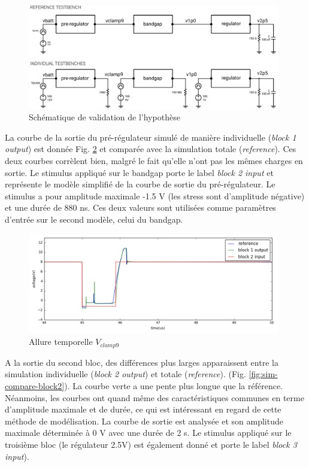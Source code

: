 \begin{figure}[!h]
  \centering
  \includegraphics[width=0.98\textwidth]{src/1/figures/hypothesis_testing_setup.pdf}
  \caption{Schématique de validation de l'hypothèse}
  \label{fig:hypothesis-setup}
\end{figure}

La courbe de la sortie du pré-régulateur simulé de manière individuelle (\textit{block 1 output}) est donnée Fig. \ref{fig:sim-compare-block1} et comparée avec la simulation totale (\textit{reference}).
Ces deux courbes corrèlent bien, malgré le fait qu'elle n'ont pas les mêmes charges en sortie.
Le stimulus appliqué sur le bandgap porte le label \textit{block 2 input} et représente le modèle simplifié de la courbe de sortie du pré-régulateur.
Le stimulus a pour amplitude maximale -1.5 V (les stress sont d'amplitude négative) et une durée de 880 ns.
Ces deux valeurs sont utilisées comme paramètres d'entrée sur le second modèle, celui du bandgap.

\begin{figure}[!h]
  \centering
  \includegraphics[width=0.98\textwidth]{src/1/figures/simulation_comparison_block1.png}
  \caption{Allure temporelle $V_{clamp9}$}
  \label{fig:sim-compare-block1}
\end{figure}

A la sortie du second bloc, des différences plus larges apparaissent entre la simulation individuelle (\textit{block 2 output}) et totale (\textit{reference}). (Fig. \ref{fig:sim-compare-block2}).
La courbe verte a une pente plus longue que la référence.
Néanmoins, les courbes ont quand même des caractéristiques communes en terme d'amplitude maximale et de durée, ce qui est intéressant en regard de cette méthode de modélisation.
La courbe de sortie est analysée et son amplitude maximale déterminée à 0 V avec une durée de 2 \textmugreek{}s.
Le stimulus appliqué sur le troisième bloc (le régulateur 2.5V) est également donné et porte le label \textit{block 3 input}).

